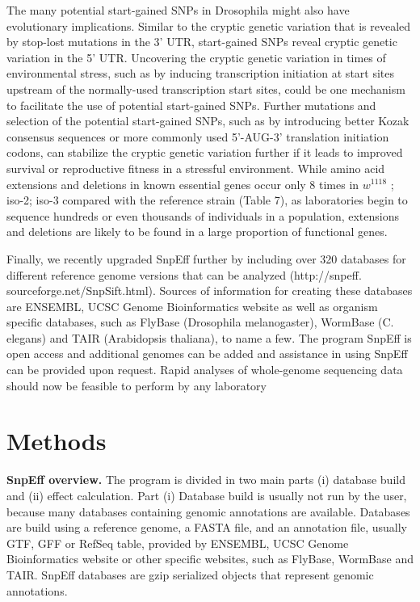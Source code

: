 The many potential start-gained SNPs in Drosophila might also have evolutionary implications. Similar to the cryptic genetic variation that is revealed by stop-lost mutations in the 3' UTR, start-gained SNPs reveal cryptic genetic variation in the 5' UTR. Uncovering the cryptic genetic variation in times of environmental stress, such as by inducing transcription initiation at start sites upstream of the normally-used transcription start sites, could be one mechanism to facilitate the use of potential start-gained SNPs. Further mutations and selection of the potential start-gained SNPs, such as by introducing better Kozak consensus sequences or more commonly used 5'-AUG-3' translation initiation codons, can stabilize the cryptic genetic variation further if it leads to improved survival or reproductive fitness in a stressful environment. While amino acid extensions and deletions in known essential genes occur only 8 times in $w^{1118}$ ; iso-2; iso-3 compared with the reference strain (Table 7), as laboratories begin to sequence hundreds or even thousands of individuals in a population, extensions and deletions are likely to be found in a large proportion of functional genes.

Finally, we recently upgraded SnpEff further by including over 320 databases for different reference genome versions that can be analyzed (http://snpeff.  sourceforge.net/SnpSift.html). Sources of information for creating these databases are ENSEMBL, UCSC Genome Bioinformatics website as well as organism specific databases, such as FlyBase (Drosophila melanogaster), WormBase (C.  elegans) and TAIR (Arabidopsis thaliana), to name a few. The program SnpEff is open access and additional genomes can be added and assistance in using SnpEff can be provided upon request. Rapid analyses of whole-genome sequencing data should now be feasible to perform by any laboratory

\section{Methods}

\textbf{SnpEff overview.} The program is divided in two main parts (i) database build and (ii) effect calculation. Part (i) Database build is usually not run by the user, because many databases containing genomic annotations are available. Databases are build using a reference genome, a FASTA file, and an annotation file, usually GTF, GFF or RefSeq table, provided by ENSEMBL, UCSC Genome Bioinformatics website or other specific websites, such as FlyBase, WormBase and TAIR. SnpEff databases are gzip serialized objects that represent genomic annotations.

